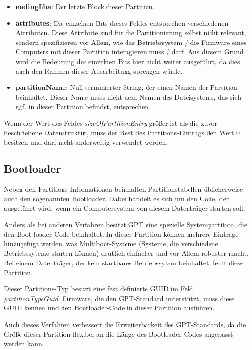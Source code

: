\begin{itemize}
    \item \textbf{endingLba}:
    Der letzte Block dieser Partition.

    \item \textbf{attributes}:
    Die einzelnen Bits dieses Feldes entsprechen verschiedenen Attributen.
    Diese Attribute sind für die Partitionierung selbst nicht relevant, sondern spezifizieren vor Allem, wie das Betriebssystem / die Firmware eines Computers mit dieser Partition interagieren muss / darf.
    Aus diesem Grund wird die Bedeutung der einzelnen Bits hier nicht weiter ausgeführt, da dies auch den Rahmen dieser Ausarbeitung sprengen würde.
    
    \item \textbf{partitionName}:
    Null-terminierter String, der einen Namen der Partition beinhaltet.
    Dieser Name muss nicht dem Namen des Dateisystems, das sich ggf. in dieser Partition befindet, entsprechen.

\end{itemize}

Wenn der Wert des Feldes \textit{sizeOfPartitionEntry} größer ist als die zuvor beschriebene Datenstruktur, muss der Rest des Partitions-Eintrags den Wert 0 besitzen und darf nicht anderweitig verwendet werden.\cite{uefi-spec}

\subsection{Bootloader}
\label{sec:gpt:bootloader}

Neben den Partitions-Informationen beinhalten Partitionstabellen üblicherweise auch den sogenannten Bootloader.
Dabei handelt es sich um den Code, der ausgeführt wird, wenn ein Computersystem von diesem Datenträger starten soll.

Anders als bei anderen Verfahren besitzt GPT eine spezielle Systempartition, die den Boot-loader-Code beinhaltet.
In dieser Partition können mehrere Einträge hinzugefügt werden, was Multiboot-Systeme (Systeme, die verschiedene Betriebssyteme starten können) deutlich einfacher und vor Allem robuster macht.\cite{heise-mbr-gpt}
Bei einem Datenträger, der kein startbares Betriebssytem beinhaltet, fehlt diese Partition.

Dieser Partitions-Typ besitzt eine fest definierte GUID im Feld \textit{partitionTypeGuid}.
Firmware, die den GPT-Standard unterstützt, muss diese GUID kennen und den Bootloader-Code in dieser Partition ausführen.

Auch dieses Verfahren verbessert die Erweiterbarkeit des GPT-Standards, da die Größe dieser Partition flexibel an die Länge des Bootloader-Codes angepasst werden kann.

